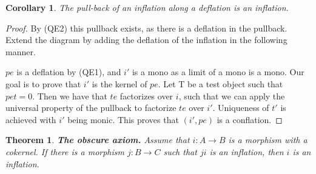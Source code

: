 \documentclass[12pt]{article}
\newtheorem{theorem}{Theorem}[section]
\newtheorem{corollary}{Corollary}[theorem]
\theoremstyle{definition}
\theoremstyle{remark}
\begin{document}
            \begin{corollary}
                The pull-back of an inflation along a deflation is an inflation.
                \begin{center}
                \end{center}
            \end{corollary}

            \begin{proof}
                By (QE2) this pullback exists, as there is a deflation in the pullback. Extend the diagram by adding the deflation of the inflation in the following manner.
                \begin{center}
                \end{center}
                $pe$ is a deflation by (QE1), and $i'$ is a mono as a limit of a mono is a mono. Our goal is to prove that $i'$ is the kernel of $pe$. Let T be a test object such that $pet=0$. Then we have that $te$ factorizes over $i$, such that we can apply the universal property of the pullback to factorize $te$ over $i'$. Uniqueness of $t'$ is achieved with $i'$ being monic. This proves that $(i',pe)$ is a conflation.
            \end{proof}

            \begin{theorem}
                \textbf{The obscure axiom.} Assume that $i:A\rightarrow B$ is a morphism with a cokernel. If there is a morphism $j:B\rightarrow C$ such that $ji$ is an inflation, then $i$ is an inflation.
            \end{theorem}
\end{document}

